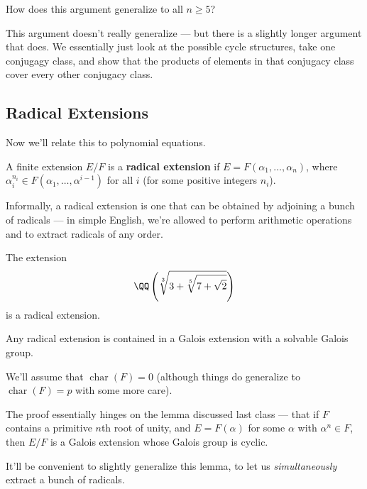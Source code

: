 \begin{question}
    How does this argument generalize to all $n \geq 5$?
\end{question}

\begin{ans}
This argument doesn't really generalize --- but there is a slightly longer argument that does. We essentially just look at the possible cycle structures, take one conjugagy class, and show that the products of elements in that conjugacy class cover every other conjugacy class. 
\end{ans}

\subsection{Radical Extensions}

Now we'll relate this to polynomial equations. 

\begin{definition}
    A finite extension $E/F$ is a \textbf{radical extension} if $E = F(\alpha_1, \ldots, \alpha_n)$, where $\alpha_i^{n_i} \in F(\alpha_1, \ldots, \alpha^{i - 1})$ for all $i$ (for some positive integers $n_i$). 
\end{definition}

Informally, a radical extension is one that can be obtained by adjoining a bunch of radicals --- in simple English, we're allowed to perform arithmetic operations and to extract radicals of any order.

\begin{example}
    The extension \[\QQ\left(\sqrt[3]{3 + \sqrt[5]{7 + \sqrt{2}}}\right)\] is a radical extension.
\end{example}

\begin{proposition} \label{radical implies solvable}
    Any radical extension is contained in a Galois extension with a solvable Galois group. 
\end{proposition}

We'll assume that $\operatorname{char}(F) = 0$ (although things do generalize to $\operatorname{char}(F) = p$ with some more care). 

The proof essentially hinges on the lemma discussed last class --- that if $F$ contains a primitive $n$th root of unity, and $E = F(\alpha)$ for some $\alpha$ with $\alpha^n \in F$, then $E/F$ is a Galois extension whose Galois group is cyclic. 

It'll be convenient to slightly generalize this lemma, to let us \emph{simultaneously} extract a bunch of radicals. 

